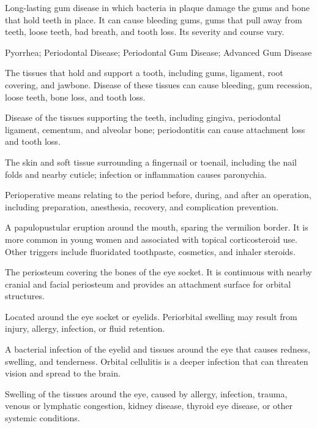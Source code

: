  Long-lasting gum disease in which bacteria in plaque damage the gums and bone that hold teeth in place. It can cause bleeding gums, gums that pull away from teeth, loose teeth, bad breath, and tooth loss. Its severity and course vary.

\synonyms
Pyorrhea; Periodontal Disease; Periodontal Gum Disease; Advanced Gum Disease

 The tissues that hold and support a tooth, including gums, ligament, root covering, and jawbone. Disease of these tissues can cause bleeding, gum recession, loose teeth, bone loss, and tooth loss.

 Disease of the tissues supporting the teeth, including gingiva, periodontal ligament, cementum, and alveolar bone; periodontitis can cause attachment loss and tooth loss.

 The skin and soft tissue surrounding a fingernail or toenail, including the nail folds and nearby cuticle; infection or inflammation causes paronychia.

 Perioperative means relating to the period before, during, and after an operation, including preparation, anesthesia, recovery, and complication prevention.

 A papulopustular eruption around the mouth, sparing the vermilion border. It is more
common in young women and associated with topical corticosteroid use. Other triggers
include fluoridated toothpaste, cosmetics, and inhaler steroids.

 The periosteum covering the bones of the eye socket. It is continuous with nearby cranial and facial periosteum and provides an attachment surface for orbital structures.

 Located around the eye socket or eyelids. Periorbital swelling may result from injury, allergy, infection, or fluid retention.

 A bacterial infection of the eyelid and tissues around the eye that causes redness, swelling, and tenderness. Orbital cellulitis is a deeper infection that can threaten vision and spread to the brain.

 Swelling of the tissues around the eye, caused by allergy, infection, trauma, venous or lymphatic congestion, kidney disease, thyroid eye disease, or other systemic conditions.

